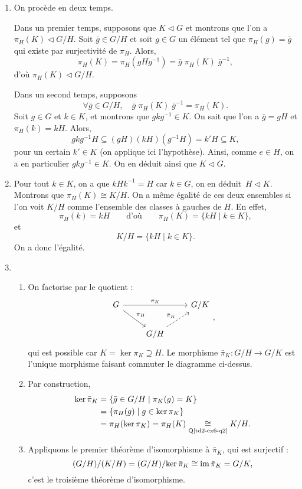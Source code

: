 \documentclass[./main]{subfiles}
\begin{document}
  \begin{enumerate}
    \item On procède en deux temps.

      Dans un premier temps, supposons que $K \triangleleft G$ et montrons que l'on a $\pi_H(K) \triangleleft G / H$.
      Soit $\bar{g} \in G/H$ et soit $g \in G$ un élément tel que $\pi_H(g) = \bar{g}$ qui existe par surjectivité de $\pi_H$.
      Alors, \[
        \pi_H(K) = \pi_H(g H g^{-1}) = \bar{g}\; \pi_H(K)\; \bar{g}^{-1}
      ,\]
      d'où $\pi_H(K) \triangleleft G / H$.

      Dans un second temps, supposons \[
      \forall \bar{g} \in G/H,\quad \bar{g}\;\pi_H(K)\;\bar{g}^{-1} = \pi_H(K)
      .\]
      Soit $g \in G$ et $k \in K$, et montrons que $gkg^{-1} \in K$.
      On sait que l'on a $\bar{g} = gH$ et $\pi_H(k) = kH$.
      Alors, \[
        gkg^{-1}H \subseteq (gH)(kH)(g^{-1}H) = k'H \subseteq K
      ,\] pour un certain $k' \in K$ (on applique ici l'hypothèse).
      Ainsi, comme $e \in H$, on a en particulier $g k g^{-1} \in K$.
      On en déduit ainsi que $K \triangleleft G$.
    \item Pour tout $k \in K$, on a que $k H k^{-1} = H$ car $k \in G$, on en déduit~$H \triangleleft K$.
      Montrons que $\pi_H(K) \cong K / H$.
      On a même égalité de ces deux ensembles si l'on voit $K / H$ comme l'ensemble des classes à gauches de $H$.
      En effet, \[
        \pi_H(k) = kH \quad\quad \text{d'où}\quad\quad \pi_H(K) = \{k H  \mid k \in K\}
      ,\]
      et \[
        K/H = \{k H  \mid k \in K\}
      .\]
      On a donc l'égalité.
    \item
      \begin{enumerate}
        \item On factorise par le quotient :
          \[
          \begin{tikzcd}
            G \arrow{rr}{\pi_K} \arrow{dr}{\pi_H} && G / K\\
            &G/H\arrow[dashed]{ur}{\bar{\pi}_K}
          \end{tikzcd}
          ,\]
          qui est possible car $K = \ker \pi_K \supseteq H$.
          Le morphisme $\bar{\pi}_K : G / H \to G / K$ est l'unique morphisme faisant commuter le diagramme ci-dessus.
        \item Par construction, 
          \begin{align*}
            \ker \bar{\pi}_K &= \{\bar{g} \in G / H  \mid \pi_K(g) = K\}\\
            &= \{\pi_H(g) \mid  g \in \ker \pi_K\}\\
            &= \pi_H(\ker \pi_K) = \pi_H(K) \underset{\text{Q\ref{td2-ex6-q2}}} \cong K / H
          .\end{align*}
        \item Appliquons le premier théorème d'isomorphisme à $\bar{\pi}_K$, qui est surjectif :
          \[
            (G / H) / (K / H) = (G / H) / {\ker \bar{\pi}_K} \cong \operatorname{im} \bar{\pi}_K = G / K
          ,\]
          c'est le troisième théorème d'isomorphisme.
      \end{enumerate}
  \end{enumerate}
\end{document}
